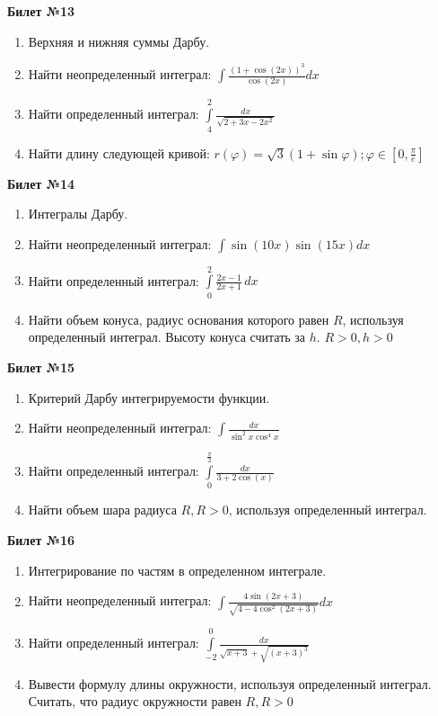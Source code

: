 \documentclass[a4paper, 12pt]{article}
\begin{document}
\begin{center}
	\textbf{Билет №13}
\end{center}
\begin{enumerate}
	\item Верхняя и нижняя суммы Дарбу.
	\item Найти неопределенный интеграл: $\displaystyle \int{\frac{(1 + \cos(2x))^3}{\cos(2x)}dx}$
	\item Найти определенный интеграл: $\displaystyle \int\limits_{4}^{2} \frac{dx}{\sqrt{2 + 3x - 2x^2}}$
	\item Найти длину следующей кривой: $\displaystyle r(\varphi) = \sqrt{3}(1+\sin{\varphi}); \varphi \in \left[0, \frac{\pi}{e}\right]$
\end{enumerate}

\begin{center}
	\textbf{Билет №14}
\end{center}
\begin{enumerate}
	\item Интегралы Дарбу.
	\item Найти неопределенный интеграл: $\displaystyle \int{\sin(10x) \sin(15x) dx}$
	\item Найти определенный интеграл: $\displaystyle \int\limits_0^2 \frac{2x - 1}{2x + 1}\,dx$
	\item Найти объем конуса, радиус основания которого равен $R$, используя определенный интеграл. Высоту конуса считать за $h$. $\displaystyle R > 0, h> 0$
\end{enumerate}
\newpage
\begin{center}
	\textbf{Билет №15}
\end{center}
\begin{enumerate}
	\item Критерий Дарбу интегрируемости функции.
	\item Найти неопределенный интеграл: $\displaystyle \int{\frac{dx}{\sin^2 x \cos^4 x}}$
	\item Найти определенный интеграл: $\displaystyle \int\limits_{0}^{\frac{\pi}{2}} \frac{dx}{3 + 2 \cos(x)}$
	\item Найти объем шара радиуса $R, R > 0$, используя определенный интеграл.
\end{enumerate}

\begin{center}
	\textbf{Билет №16}
\end{center}
\begin{enumerate}
	\item Интегрирование по частям в определенном интеграле.
	\item Найти неопределенный интеграл: $\displaystyle \int{\frac{4 \sin(2x+3)}{\sqrt{4 - 4\cos^2(2x+3)}}dx}$
	\item Найти определенный интеграл: $\displaystyle \int\limits_{-2}^{0} \frac{dx}{\sqrt{x+3}+\sqrt{(x+3)^{3}}}$
	\item Вывести формулу длины окружности, используя определенный интеграл. Считать, что радиус окружности равен $R, R>0$ 
\end{enumerate}
\end{document}
